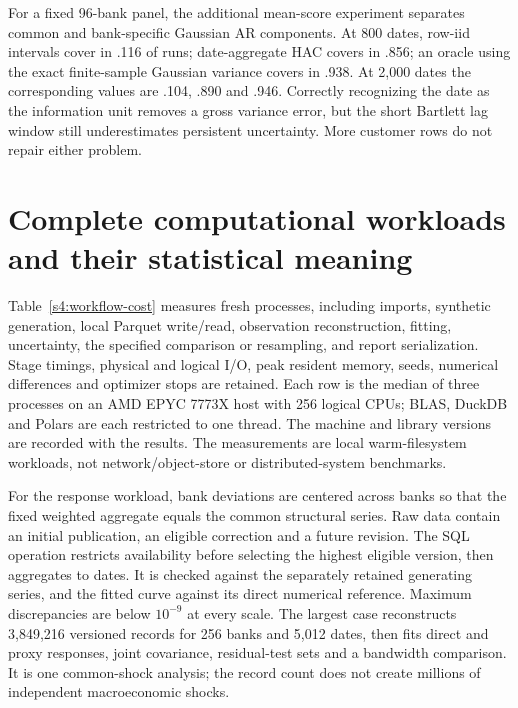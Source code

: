 For a fixed 96-bank panel, the additional mean-score experiment separates
common and bank-specific Gaussian AR components. At 800 dates, row-iid
intervals cover in .116 of runs; date-aggregate HAC covers in .856; an
oracle using the exact finite-sample Gaussian variance covers in .938.
At 2,000 dates the corresponding values are .104, .890 and .946.
Correctly recognizing the date as the information unit removes a gross
variance error, but the short Bartlett lag window still underestimates
persistent uncertainty. More customer rows do not repair either problem.

\section{Complete computational workloads and their statistical meaning}
\label{s4:workflow-results}
Table~\ref{s4:workflow-cost} measures fresh processes, including imports,
synthetic generation, local Parquet write/read, observation reconstruction,
fitting, uncertainty, the specified comparison or resampling, and report
serialization. Stage timings, physical and logical I/O, peak resident
memory, seeds, numerical differences and optimizer stops are retained.
Each row is the median of three processes on an AMD EPYC 7773X host with
256 logical CPUs; BLAS, DuckDB and Polars are each restricted to one thread.
The machine and library versions are recorded with the results. The
measurements are local warm-filesystem workloads, not network/object-store
or distributed-system benchmarks.

\begin{table}[htbp]\centering\small

\caption{Complete synthetic workload cost. Response rows include three raw
versions per bank/date; learning rows include two versions per date.
Latent rows include 19 whole-trajectory bootstrap refits with three starts.
Memory includes the interpreter, libraries and retained synthetic arrays.}
\label{s4:workflow-cost}
\end{table}

For the response workload, bank deviations are centered across banks so
that the fixed weighted aggregate equals the common structural series.
Raw data contain an initial publication, an eligible correction and a
future revision. The SQL operation restricts availability before selecting
the highest eligible version, then aggregates to dates. It is checked
against the separately retained generating series, and the fitted curve
against its direct numerical reference. Maximum discrepancies are below
$10^{-9}$ at every scale. The largest case reconstructs 3,849,216 versioned
records for 256 banks and 5,012 dates, then fits direct and proxy responses,
joint covariance, residual-test sets and a bandwidth comparison. It is
one common-shock analysis; the record count does not create millions of
independent macroeconomic shocks.

